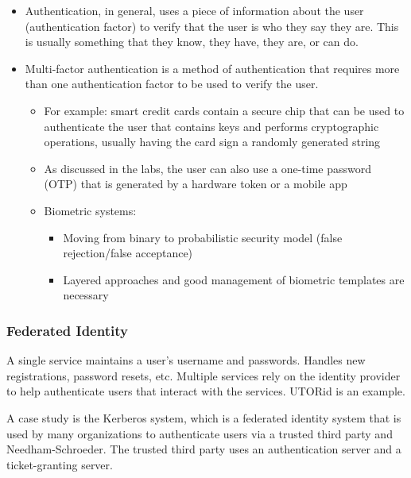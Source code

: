 \documentclass[../notes.tex]{subfiles}
\begin{document}
\begin{itemize}
    \item Authentication, in general, uses a piece of information about the user (authentication factor) to verify that the user is who they say they are. This is usually something that they know, they have, they are, or can do.
    \item Multi-factor authentication is a method of authentication that requires more than one authentication factor to be used to verify the user.
        \begin{itemize}
            \item For example: smart credit cards contain a secure chip that can be used to authenticate the user that contains keys and performs cryptographic operations, usually having the card sign a randomly generated string
            \item As discussed in the labs, the user can also use a one-time password (OTP) that is generated by a hardware token or a mobile app
            \item Biometric systems:
                \begin{itemize}
                    \item Moving from binary to probabilistic security model (false rejection/false acceptance)
                    \item Layered approaches and good management of biometric templates are necessary
                \end{itemize}
        \end{itemize}
\end{itemize}


\subsubsection{Federated Identity}

A single service maintains a user's username and passwords. Handles new registrations, password resets, etc. Multiple services rely on the identity provider to help authenticate users that interact with the services. UTORid is an example.

A case study is the Kerberos system, which is a federated identity system that is used by many organizations to authenticate users via a trusted third party and Needham-Schroeder. The trusted third party uses an authentication server and a ticket-granting server.
\end{document}
